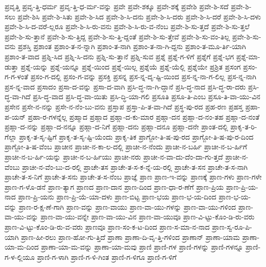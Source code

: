 {ಪ್ರವೃತ್ತಿ
ಪ್ರವೃ-ತ್ತಿ-ಧರ್ಮ
ಪ್ರವೃ-ತ್ತಿ-ಧ-ರ್ಮ-ವನ್ನು
ಪ್ರವೇ
ಪ್ರವೇ-ಶಕ್ಕೂ
ಪ್ರವೇ-ಶಕ್ಕೆ
ಪ್ರವೇಶಿ
ಪ್ರವೇ-ಶಿ-ಸದೆ
ಪ್ರವೇ-ಶಿ-ಸಲು
ಪ್ರವೇ-ಶಿಸಿ
ಪ್ರವೇ-ಶಿ-ಸಿತು
ಪ್ರವೇ-ಶಿ-ಸಿದ
ಪ್ರವೇ-ಶಿ-ಸಿ-ದನು
ಪ್ರವೇ-ಶಿ-ಸಿ-ದರು
ಪ್ರವೇ-ಶಿ-ಸಿ-ದರೆ
ಪ್ರವೇ-ಶಿ-ಸಿ-ದಳು
ಪ್ರವೇ-ಶಿ-ಸಿ-ದ-ವರೆ-ಲ್ಲರೂ
ಪ್ರವೇ-ಶಿ-ಸಿ-ರು-ವನು
ಪ್ರವೇ-ಶಿ-ಸಿ-ರು-ವ-ನೆಂಬ
ಪ್ರವೇ-ಶಿ-ಸು-ತ್ತದೆ
ಪ್ರವೇ-ಶಿ-ಸು-ತ್ತಲೆ
ಪ್ರವೇ-ಶಿ-ಸು-ತ್ತಾನೆ
ಪ್ರವೇ-ಶಿ-ಸು-ತ್ತಿದ್ದ
ಪ್ರವೇ-ಶಿ-ಸು-ತ್ತಿ-ದ್ದಂತೆ
ಪ್ರವೇ-ಶಿ-ಸು-ತ್ತೇವೆ
ಪ್ರವೇ-ಶಿ-ಸು-ವಂ-ತಿಲ್ಲ
ಪ್ರವೇ-ಶಿ-ಸು-ವನು
ಪ್ರಶಸ್ತಿ
ಪ್ರಶಾಂತ
ಪ್ರಶಾಂ-ತ-ನ-ನ್ನಾಗಿ
ಪ್ರಶಾಂ-ತ-ನಾಗಿ
ಪ್ರಶಾಂ-ತ-ನಾ-ಗಿ-ದ್ದನು
ಪ್ರಶಾಂ-ತ-ಮೂ-ರ್ತಿ-ಯಾಗಿ
ಪ್ರಶಾಂ-ತ-ವಾದ
ಪ್ರಶ್ನಿ-ಸಿದ
ಪ್ರಶ್ನಿ-ಸಿ-ದನು
ಪ್ರಶ್ನಿ-ಸು-ತ್ತಾನೆ
ಪ್ರಶ್ನಿ-ಸುವ
ಪ್ರಶ್ನೆ
ಪ್ರಶ್ನೆ-ಗ-ಳಿಗೆ
ಪ್ರಶ್ನೆಗೆ
ಪ್ರಶ್ನೆ-ಭಗ
ಪ್ರಶ್ನೆ-ಮಾ-ಡುತ್ತಾ
ಪ್ರಶ್ನೆ-ಯನ್ನು
ಪ್ರಶ್ನೆ-ಯನ್ನೂ
ಪ್ರಶ್ನೆ-ಯಿಂದ
ಪ್ರಶ್ನೆ-ಯಿಲ್ಲ
ಪ್ರಶ್ನೆಯೆ
ಪ್ರಶ್ನೆ-ಯೆಲ್ಲಿ
ಪ್ರಶ್ನೆಯೇ
ಪ್ರಶ್ರಿತ
ಪ್ರಸಂಗ
ಪ್ರಸಂ-ಗ-ಗ-ಳಂತೆ
ಪ್ರಸಂ-ಗ-ದಲ್ಲಿ
ಪ್ರಸಂ-ಗ-ವನ್ನು
ಪ್ರಸಕ್ತಿ
ಪ್ರಸನ್ನ
ಪ್ರಸ-ನ್ನ-ದೃ-ಷ್ಟಿ-ಯಿಂದ
ಪ್ರಸ-ನ್ನ-ನಾ-ಗ-ಲಿಲ್ಲ
ಪ್ರಸ-ನ್ನ-ನಾಗಿ
ಪ್ರಸ-ನ್ನ-ವಾದ
ಪ್ರಸಾದಂ
ಪ್ರಸಾ-ದ-ವನ್ನು
ಪ್ರಸಾ-ದ-ವಾಗಿ
ಪ್ರಸಿ-ದ್ಧ-ನಾ-ಗಿ-ದ್ದಾನೆ
ಪ್ರಸಿ-ದ್ಧ-ನಾದ
ಪ್ರಸಿ-ದ್ಧ-ರಾ-ದರು
ಪ್ರಸಿ-ದ್ಧ-ವಾ-ಗಿದೆ
ಪ್ರಸಿ-ದ್ಧ-ವಾದ
ಪ್ರಸಿ-ದ್ಧ-ವಾ-ಯಿತು
ಪ್ರಸಿ-ದ್ಧಿ-ಯಾ-ಗಲಿ
ಪ್ರಸೂತಿ
ಪ್ರಸೂ-ತಿ-ಎಂಬ
ಪ್ರಸೂ-ತಿ-ವಾ-ಯು-ವಿನ
ಪ್ರಸೇನ
ಪ್ರಸೇ-ನ-ನನ್ನು
ಪ್ರಸೇ-ನ-ನೆಂ-ಬು-ವನು
ಪ್ರಸ್ತಾಪ
ಪ್ರಸ್ತಾ-ಪಿ-ತ-ವಾ-ಗಿದೆ
ಪ್ರಸ್ಥ-ಪು-ರದ
ಪ್ರಹ-ರಣ
ಪ್ರಹಸ್ತ
ಪ್ರಹಾ-ಪ-ಯನ್
ಪ್ರಹಾ-ರ-ಗಳನ್ನೆಲ್ಲ
ಪ್ರಹ್ಮಾದ
ಪ್ರಹ್ಲಾದ
ಪ್ರಹ್ಲಾ-ದ-ಕು-ಮಾರ
ಪ್ರಹ್ಲಾ-ದನ
ಪ್ರಹ್ಲಾ-ದ-ನಂ-ತಹ
ಪ್ರಹ್ಲಾ-ದ-ನಂತೆ
ಪ್ರಹ್ಲಾ-ದ-ನನ್ನು
ಪ್ರಹ್ಲಾ-ದ-ನನ್ನೂ
ಪ್ರಹ್ಲಾ-ದ-ನಿಗೆ
ಪ್ರಹ್ಲಾ-ದನು
ಪ್ರಹ್ಲಾ-ದನೂ
ಪ್ರಹ್ಲಾ-ದನೇ
ಪ್ರಾಂತ-ದಲ್ಲಿ
ಪ್ರಾಕೃ-ತ-ರಿ-ಗೆಲ್ಲಾ
ಪ್ರಾಕೃ-ತ-ಸೃ-ಷ್ಟಿಗೆ
ಪ್ರಾಕೃ-ತ-ಸೃ-ಷ್ಟಿ-ಯೆಂದು
ಪ್ರಾಕೃ-ತಿಕ
ಪ್ರಾಗ್ಜೋ-ತಿ-ಷ-ಪು-ರದ
ಪ್ರಾಗ್ಜೋ-ತಿ-ಷ-ಪು-ರ-ದಿಂದ
ಪ್ರಾಗ್ಜೋ-ತಿ-ಷ-ವೆಂಬ
ಪ್ರಾಚೀನ
ಪ್ರಾಚೀ-ನ-ಕಾ-ಲ-ದಲ್ಲಿ
ಪ್ರಾಚೀ-ನ-ನೆಂದು
ಪ್ರಾಚೀ-ನ-ಬರ್ಹಿ
ಪ್ರಾಚೀ-ನ-ಬ-ರ್ಹಿಗೆ
ಪ್ರಾಚೀ-ನ-ಬ-ರ್ಹಿ-ಯನ್ನು
ಪ್ರಾಚೀ-ನ-ಬ-ರ್ಹಿಯು
ಪ್ರಾಚೀ-ನರು
ಪ್ರಾಚೀ-ನ-ವಾ-ದು-ದೆಂ-ದಾ-ಗು-ತ್ತದೆ
ಪ್ರಾಚೀ-ನ-ವೆಂಬು
ಪ್ರಾಚೀ-ನ-ವೆಂ-ಬು-ದ-ರಲ್ಲಿ
ಪ್ರಾಚೇ-ತಸ
ಪ್ರಾಚೇ-ತ-ಸ-ಕ-ನ್ನೆ-ಯ-ರಲ್ಲಿ
ಪ್ರಾಚೇ-ತ-ಸನ
ಪ್ರಾಚೇ-ತ-ಸ-ನಾಗಿ
ಪ್ರಾಚೇ-ತ-ಸ-ನಿಗೆ
ಪ್ರಾಚೇ-ತ-ಸನು
ಪ್ರಾಚೇ-ತ-ಸ-ನೆಂಬ
ಪ್ರಾಜ್ಞೆ
ಪ್ರಾಣ
ಪ್ರಾಣ-ಇ-ವನ್ನು
ಪ್ರಾಣಕ್ಕೆ
ಪ್ರಾಣ-ಗಳು
ಪ್ರಾಣ-ಗಳೇ
ಪ್ರಾಣ-ಗ-ಳೊ-ಡನೆ
ಪ್ರಾಣ-ತ್ಯಾಗ
ಪ್ರಾಣದ
ಪ್ರಾಣ-ದಾನ
ಪ್ರಾಣ-ದಿಂದ
ಪ್ರಾಣ-ಧಾ-ರ-ಣೆಗೆ
ಪ್ರಾಣ-ಪ್ರಿಯ
ಪ್ರಾಣ-ಪ್ರಿ-ಯ-ನಾದ
ಪ್ರಾಣ-ಪ್ರಿ-ಯನು
ಪ್ರಾಣ-ಪ್ರಿ-ಯೆ-ಯಾ-ದಳು
ಪ್ರಾಣ-ಬಿಟ್ಟ
ಪ್ರಾಣ-ಭಯ
ಪ್ರಾಣ-ಭ-ಯ-ದಿಂದ
ಪ್ರಾಣ-ಭ-ಯ-ವನ್ನು
ಪ್ರಾಣ-ರ-ಕ್ಷ-ಣೆ-ಗಾಗಿ
ಪ್ರಾಣ-ವನ್ನು
ಪ್ರಾಣ-ವಾಯು
ಪ್ರಾಣ-ವಾ-ಯು-ಗಳನ್ನು
ಪ್ರಾಣ-ವಾ-ಯು-ಗಳಿಂದ
ಪ್ರಾಣ-ವಾ-ಯು-ವನ್ನು
ಪ್ರಾಣ-ವಾ-ಯು-ವನ್ನೇ
ಪ್ರಾಣ-ವಾ-ಯು-ವಿನ
ಪ್ರಾಣ-ವಾ-ಯುವೂ
ಪ್ರಾಣ-ವಿ-ಟ್ಟು-ಕೊಂ-ಡಿ-ರು-ವರು
ಪ್ರಾಣ-ವಿ-ಟ್ಟು-ಕೊಂ-ಡಿ-ರು-ವ-ವರು
ಪ್ರಾಣವೂ
ಪ್ರಾಣ-ಸಂ-ಕ-ಟ-ದಿಂದ
ಪ್ರಾಣ-ಸ-ಮಾ-ನ-ನಾದ
ಪ್ರಾಣ-ಸ್ವ-ರೂ-ಪಿ-ಯಾಗಿ
ಪ್ರಾಣ-ಹೀ-ರಲು
ಪ್ರಾಣ-ಹೋ-ಗು-ತ್ತಿದೆ
ಪ್ರಾಣಾ
ಪ್ರಾಣಾ-ದಿ-ವೃ-ತ್ತಿ-ಗಳಿಂದ
ಪ್ರಾಣಾನ್
ಪ್ರಾಣಾ-ಯಾಮ
ಪ್ರಾಣಾ-ಯಾ-ಮ-ದಿಂದ
ಪ್ರಾಣಾ-ಯಾ-ಮ-ವನ್ನು
ಪ್ರಾಣಾ-ಯಾ-ಮವು
ಪ್ರಾಣಿ
ಪ್ರಾಣಿ-ಗಳ
ಪ್ರಾಣಿ-ಗಳನ್ನು
ಪ್ರಾಣಿ-ಗಳನ್ನೂ
ಪ್ರಾಣಿ-ಗ-ಳ-ಲ್ಲಿಯೂ
ಪ್ರಾಣಿ-ಗ-ಳಾಗಿ
ಪ್ರಾಣಿ-ಗ-ಳಿ-ಗಿಂತ
ಪ್ರಾಣಿ-ಗ-ಳಿಗೂ
ಪ್ರಾಣಿ-ಗ-ಳಿಗೆ
}
